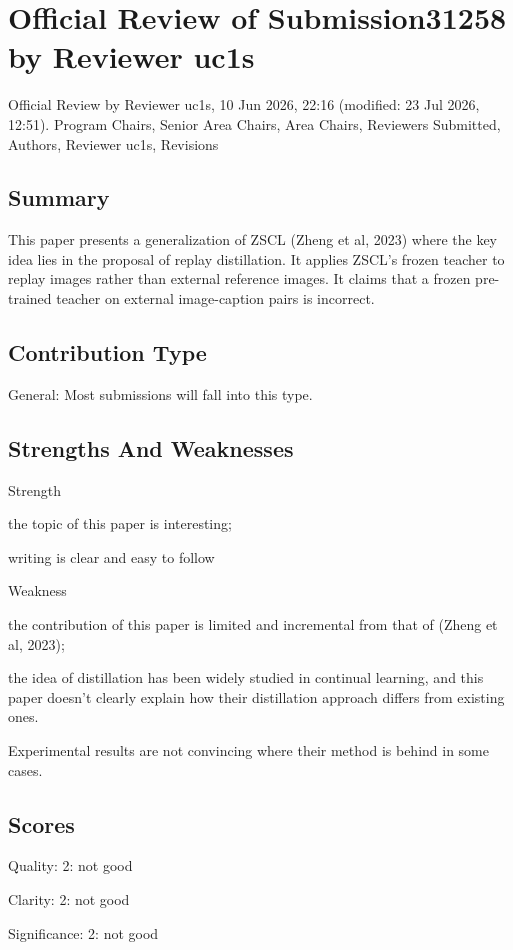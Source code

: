 \documentclass[11pt]{article}
\begin{document}
\newpage
\section*{Official Review of Submission31258 by Reviewer uc1s}

Official Review by Reviewer uc1s, 10 Jun 2026, 22:16 (modified: 23 Jul 2026, 12:51). Program Chairs, Senior Area Chairs, Area Chairs, Reviewers Submitted, Authors, Reviewer uc1s, Revisions

\subsection*{Summary}
This paper presents a generalization of ZSCL (Zheng et al, 2023) where the key idea lies in the proposal of replay distillation. It applies ZSCL's frozen teacher to replay images rather than external reference images. It claims that a frozen pre-trained teacher on external image-caption pairs is incorrect.

\subsection*{Contribution Type}
General: Most submissions will fall into this type.

\subsection*{Strengths And Weaknesses}
Strength

the topic of this paper is interesting;

writing is clear and easy to follow

Weakness

the contribution of this paper is limited and incremental from that of (Zheng et al, 2023);

the idea of distillation has been widely studied in continual learning, and this paper doesn't clearly explain how their distillation approach differs from existing ones.

Experimental results are not convincing where their method is behind in some cases.

\subsection*{Scores}
Quality: 2: not good

Clarity: 2: not good

Significance: 2: not good
\end{document}
